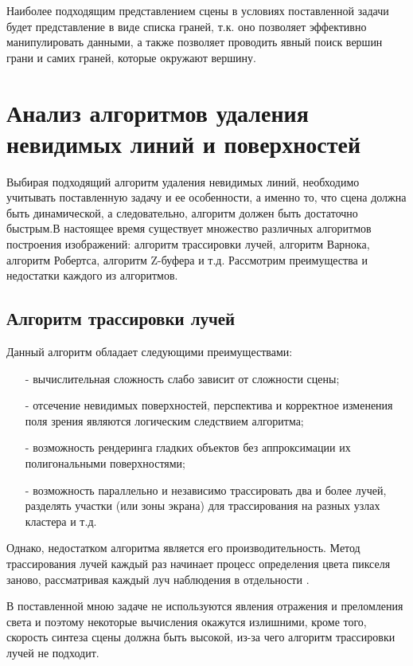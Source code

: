 Наиболее подходящим представлением сцены в условиях поставленной задачи будет представление в виде списка граней, т.к. оно позволяет эффективно манипулировать данными, а также позволяет проводить явный поиск вершин грани и самих граней, которые окружают вершину.

\section{Анализ алгоритмов удаления невидимых линий и поверхностей}

Выбирая подходящий алгоритм удаления невидимых линий, необходимо учитывать поставленную задачу и ее особенности, а именно то, что сцена должна быть динамической, а следовательно, алгоритм должен быть достаточно быстрым.В настоящее время существует множество различных алгоритмов построения изображений: алгоритм трассировки лучей, алгоритм Варнока, алгоритм Робертса, алгоритм Z-буфера и т.д. Рассмотрим преимущества и недостатки каждого из алгоритмов.

\subsection{Алгоритм трассировки лучей}

Данный алгоритм обладает следующими преимуществами:
\begin{itemize}
	\item[-] вычислительная сложность слабо зависит от сложности сцены;
	\item[-] отсечение невидимых поверхностей, перспектива и корректное изменения поля зрения являются логическим следствием алгоритма;
	\item[-] возможность рендеринга гладких объектов без аппроксимации их полигональными поверхностями;
	\item[-] возможность параллельно и независимо трассировать два и более лучей, разделять участки (или зоны экрана) для трассирования на разных узлах кластера и т.д.
\end{itemize}

Однако, недостатком алгоритма является его производительность. Метод трассирования лучей каждый раз начинает процесс определения цвета пикселя заново, рассматривая каждый луч наблюдения в отдельности \cite{raytrace}.

В поставленной мною задаче не используются явления отражения и преломления света и поэтому некоторые вычисления окажутся излишними, кроме того, скорость синтеза сцены должна быть высокой, из-за чего алгоритм трассировки лучей не подходит.

